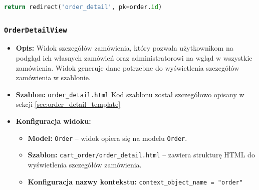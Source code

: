 \documentclass[12pt,a4paper,oneside]{article}
\theoremstyle{definition}
\numberwithin{equation}{section}
\begin{document}
\begin{lstlisting}[language=Python]
return redirect('order_detail', pk=order.id)
\end{lstlisting}

\subsubsection*{\texttt{OrderDetailView}}
\begin{itemize}
    \item \textbf{Opis:} Widok szczegółów zamówienia, który pozwala użytkownikom na podgląd ich własnych zamówień oraz administratorowi na wgląd w wszystkie zamówienia. Widok generuje dane potrzebne do wyświetlenia szczegółów zamówienia w szablonie.
    \item \textbf{Szablon:} \texttt{order\_detail.html}
            \subsubitem Kod szablonu został szczegółowo opisany w sekcji \ref{sec:order_detail_template}
    \item \textbf{Konfiguracja widoku:}
    \begin{itemize}
        \item \textbf{Model:} \texttt{Order} – widok opiera się na modelu \texttt{Order}.
        \item \textbf{Szablon:} \texttt{cart\_order/order\_detail.html} – zawiera strukturę HTML do wyświetlenia szczegółów zamówienia.
        \item \textbf{Konfiguracja nazwy kontekstu:} \texttt{context\_object\_name = "order"}
    \end{itemize}
\end{itemize}
\end{document}
